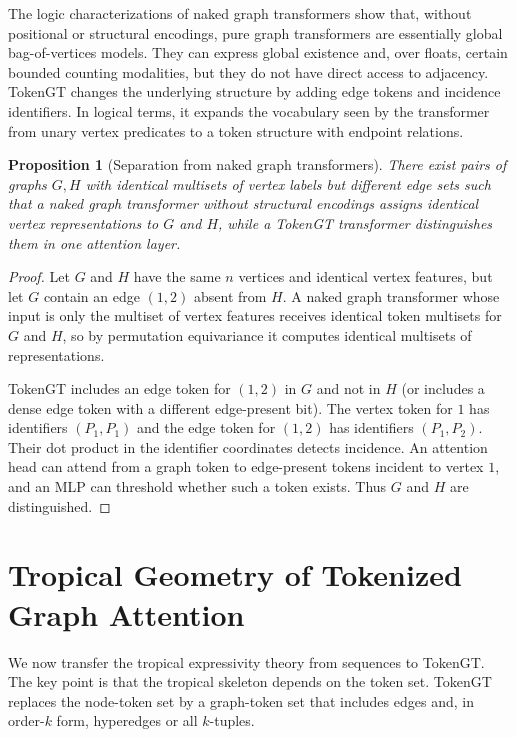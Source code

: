 \documentclass[11pt]{article}
\newtheorem{proposition}[theorem]{Proposition}
\begin{document}
The logic characterizations of naked graph transformers \cite{ahvonen2026logic} show that, without positional or structural encodings, pure graph transformers are essentially global bag-of-vertices models.  They can express global existence and, over floats, certain bounded counting modalities, but they do not have direct access to adjacency.  TokenGT changes the underlying structure by adding edge tokens and incidence identifiers.  In logical terms, it expands the vocabulary seen by the transformer from unary vertex predicates to a token structure with endpoint relations.

\begin{proposition}[Separation from naked graph transformers]
\label{prop:naked-separation}
There exist pairs of graphs $G,H$ with identical multisets of vertex labels but different edge sets such that a naked graph transformer without structural encodings assigns identical vertex representations to $G$ and $H$, while a TokenGT transformer distinguishes them in one attention layer.
\end{proposition}

\begin{proof}
Let $G$ and $H$ have the same $n$ vertices and identical vertex features, but let $G$ contain an edge $(1,2)$ absent from $H$.  A naked graph transformer whose input is only the multiset of vertex features receives identical token multisets for $G$ and $H$, so by permutation equivariance it computes identical multisets of representations.

TokenGT includes an edge token for $(1,2)$ in $G$ and not in $H$ (or includes a dense edge token with a different edge-present bit).  The vertex token for $1$ has identifiers $(P_1,P_1)$ and the edge token for $(1,2)$ has identifiers $(P_1,P_2)$.  Their dot product in the identifier coordinates detects incidence.  An attention head can attend from a graph token to edge-present tokens incident to vertex $1$, and an MLP can threshold whether such a token exists.  Thus $G$ and $H$ are distinguished.
\end{proof}

\section{Tropical Geometry of Tokenized Graph Attention}
\label{sec:tropical}

We now transfer the tropical expressivity theory from sequences to TokenGT.  The key point is that the tropical skeleton depends on the token set.  TokenGT replaces the node-token set by a graph-token set that includes edges and, in order-$k$ form, hyperedges or all $k$-tuples.
\end{document}
